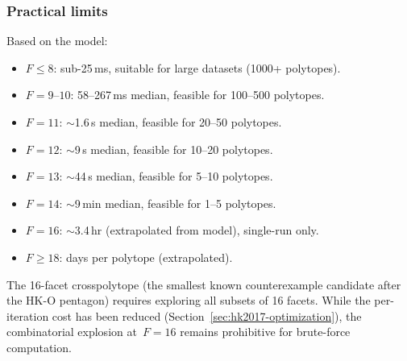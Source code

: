 \subsubsection*{Practical limits}

Based on the model:
\begin{itemize}
  \item $F \le 8$: sub-25\,ms, suitable for large datasets (1000+ polytopes).
  \item $F = 9$--$10$: 58--267\,ms median, feasible for 100--500 polytopes.
  \item $F = 11$: $\sim$1.6\,s median, feasible for 20--50 polytopes.
  \item $F = 12$: $\sim$9\,s median, feasible for 10--20 polytopes.
  \item $F = 13$: $\sim$44\,s median, feasible for 5--10 polytopes.
  \item $F = 14$: $\sim$9\,min median, feasible for 1--5 polytopes.
  \item $F = 16$: $\sim$3.4\,hr (extrapolated from model), single-run only.
  \item $F \ge 18$: days per polytope (extrapolated).
\end{itemize}

The 16-facet crosspolytope (the smallest known counterexample candidate after
the HK-O pentagon) requires exploring all subsets of 16 facets. While the
per-iteration cost has been reduced (Section~\ref{sec:hk2017-optimization}), the
combinatorial explosion at~$F = 16$ remains prohibitive for brute-force
computation.
